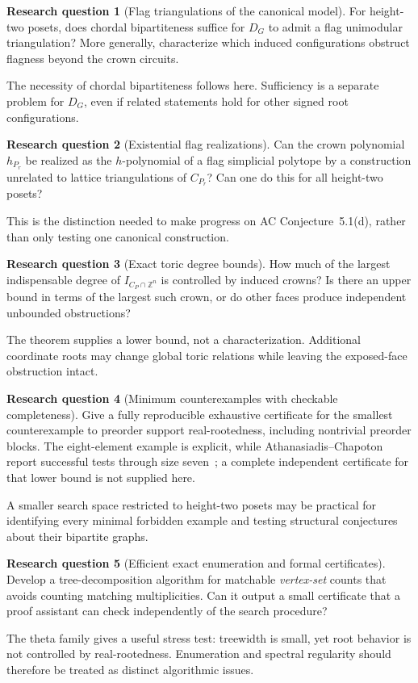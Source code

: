 \documentclass[11pt]{article}
\numberwithin{equation}{section}
\theoremstyle{definition}
\newtheorem{question}{Research question}%
\newcommand{\Z}{\mathbb Z}
\begin{document}
\begin{question}[Flag triangulations of the canonical model]
For height-two posets, does chordal bipartiteness suffice for $D_G$ to
admit a flag unimodular triangulation? More generally, characterize which
induced configurations obstruct flagness beyond the crown circuits.
\end{question}
The necessity of chordal bipartiteness follows here. Sufficiency is a
separate problem for $D_G$, even if related statements hold for other
signed root configurations.

\begin{question}[Existential flag realizations]
Can the crown polynomial $h_{P_r}$ be realized as the $h$-polynomial of a
flag simplicial polytope by a construction unrelated to lattice
triangulations of $C_{P_r}$? Can one do this for all height-two posets?
\end{question}
This is the distinction needed to make progress on AC
Conjecture~5.1(d), rather than only testing one canonical construction.

\begin{question}[Exact toric degree bounds]
How much of the largest indispensable degree of $I_{C_P\cap\Z^n}$ is
controlled by induced crowns? Is there an upper bound in terms of the
largest such crown, or do other faces produce independent unbounded
obstructions?
\end{question}
The theorem supplies a lower bound, not a characterization. Additional
coordinate roots may change global toric relations while leaving the
exposed-face obstruction intact.

\begin{question}[Minimum counterexamples with checkable completeness]
Give a fully reproducible exhaustive certificate for the smallest
counterexample to preorder support real-rootedness, including nontrivial
preorder blocks. The eight-element example is explicit, while
Athanasiadis--Chapoton report successful tests through size seven~\cite{AC};
a complete independent certificate for that lower bound is not supplied here.
\end{question}
A smaller search space restricted to height-two posets may be practical
for identifying every minimal forbidden example and testing structural
conjectures about their bipartite graphs.

\begin{question}[Efficient exact enumeration and formal certificates]
Develop a tree-decomposition algorithm for matchable \emph{vertex-set}
counts that avoids counting matching multiplicities. Can it output a
small certificate that a proof assistant can check independently of the
search procedure?
\end{question}
The theta family gives a useful stress test: treewidth is small, yet root
behavior is not controlled by real-rootedness. Enumeration and spectral
regularity should therefore be treated as distinct algorithmic issues.
\end{document}

